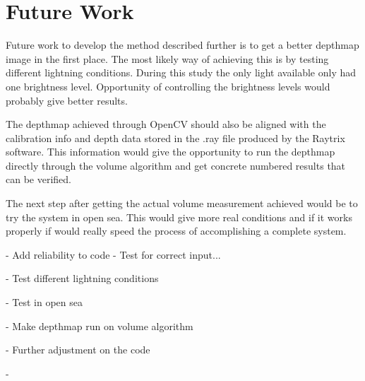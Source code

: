 \section{Future Work} \label{future_work}

Future work to develop the method described further is to get a better depthmap image in the first place. The most likely way of achieving this is by testing different lightning conditions. During this study the only light available only had one brightness level. Opportunity of controlling the brightness levels would probably give better results. 

The depthmap achieved through OpenCV should also be aligned with the calibration info and depth data stored in the .ray file produced by the Raytrix software. This information would give the opportunity to run the depthmap directly through the volume algorithm and get concrete numbered results that can be verified.

The next step after getting the actual volume measurement achieved would be to try the system in open sea. This would give more real conditions and if it works properly if would really speed the process of accomplishing a complete system. 




{\color{red}

- Add reliability to code
    - Test for correct input...

- Test different lightning conditions

- Test in open sea

- Make depthmap run on volume algorithm

- Further adjustment on the code

- 
}